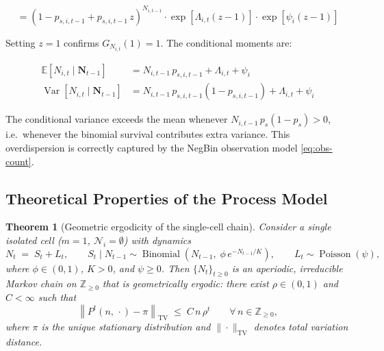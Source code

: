 \documentclass[12pt,a4paper]{article}
\newtheorem{theorem}{Theorem}
\theoremstyle{definition}
\newcommand{\E}{\mathbb{E}}
\newcommand{\Var}{\operatorname{Var}}
\newcommand{\Pois}{\operatorname{Poisson}}
\newcommand{\Bin}{\operatorname{Binomial}}
\begin{document}
\begin{equation}
  = \left(1 - p_{s,i,t-1} + p_{s,i,t-1}\, z\right)^{N_{i,t-1}}
    \cdot \exp\!\left[\Lambda_{i,t}(z-1)\right]
    \cdot \exp\!\left[\psi_i(z-1)\right]
  \label{eq:pgf-expanded}
\end{equation}

Setting $z=1$ confirms $G_{N_{i,t}}(1)=1$.  The conditional moments are:

\begin{align}
  \E\!\left[N_{i,t} \mid \mathbf{N}_{t-1}\right]
    &= N_{i,t-1}\, p_{s,i,t-1} + \Lambda_{i,t} + \psi_i
  \label{eq:cond-mean} \\[4pt]
  \Var\!\left[N_{i,t} \mid \mathbf{N}_{t-1}\right]
    &= N_{i,t-1}\, p_{s,i,t-1}\!\left(1-p_{s,i,t-1}\right)
       + \Lambda_{i,t} + \psi_i
  \label{eq:cond-var}
\end{align}

The conditional variance exceeds the mean whenever $N_{i,t-1}\,p_{s}(1-p_s)>0$,
i.e.\ whenever the binomial survival contributes extra variance.  This
overdispersion is correctly captured by the NegBin observation model
\eqref{eq:obs-count}.

\subsection{Theoretical Properties of the Process Model}

\begin{theorem}[Geometric ergodicity of the single-cell chain]
\label{thm:ergodicity}
Consider a single isolated cell ($m=1$, $\mathcal{N}_i=\emptyset$) with
dynamics
\[
  N_t \;=\; S_t + L_t,
  \qquad
  S_t \mid N_{t-1} \sim \Bin\!\left(N_{t-1},\; \phi\,e^{-N_{t-1}/K}\right),
  \qquad
  L_t \sim \Pois(\psi),
\]
where $\phi \in (0,1)$, $K > 0$, and $\psi \geq 0$.  Then $\{N_t\}_{t\geq 0}$
is an aperiodic, irreducible Markov chain on $\mathbb{Z}_{\geq 0}$ that is
\emph{geometrically ergodic}: there exist $\rho \in (0,1)$ and $C < \infty$
such that
\[
  \left\|P^t(n,\,\cdot) - \pi\right\|_{\mathrm{TV}}
  \;\leq\; C\,n\,\rho^t
  \qquad \forall\,n \in \mathbb{Z}_{\geq 0},
\]
where $\pi$ is the unique stationary distribution and $\|\cdot\|_{\mathrm{TV}}$
denotes total variation distance.
\end{theorem}
\end{document}

